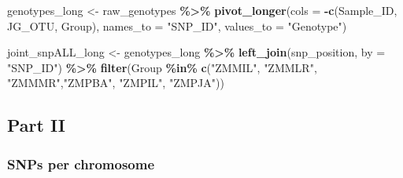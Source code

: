 \documentclass[
]{article}
\newenvironment{Shaded}{\begin{snugshade}}{\end{snugshade}}
\newcommand{\AttributeTok}[1]{\textcolor[rgb]{0.13,0.29,0.53}{#1}}
\newcommand{\FunctionTok}[1]{\textcolor[rgb]{0.13,0.29,0.53}{\textbf{#1}}}
\newcommand{\NormalTok}[1]{#1}
\newcommand{\OtherTok}[1]{\textcolor[rgb]{0.56,0.35,0.01}{#1}}
\newcommand{\SpecialCharTok}[1]{\textcolor[rgb]{0.81,0.36,0.00}{\textbf{#1}}}
\newcommand{\StringTok}[1]{\textcolor[rgb]{0.31,0.60,0.02}{#1}}
\begin{document}
\begin{Shaded}
\begin{Highlighting}[]
\NormalTok{genotypes\_long }\OtherTok{\textless{}{-}}\NormalTok{ raw\_genotypes }\SpecialCharTok{\%\textgreater{}\%}
  \FunctionTok{pivot\_longer}\NormalTok{(}\AttributeTok{cols =} \SpecialCharTok{{-}}\FunctionTok{c}\NormalTok{(Sample\_ID, JG\_OTU, Group), }\AttributeTok{names\_to =} \StringTok{"SNP\_ID"}\NormalTok{, }\AttributeTok{values\_to =} \StringTok{"Genotype"}\NormalTok{)}

\NormalTok{joint\_snpALL\_long }\OtherTok{\textless{}{-}}\NormalTok{ genotypes\_long }\SpecialCharTok{\%\textgreater{}\%}
  \FunctionTok{left\_join}\NormalTok{(snp\_position, }\AttributeTok{by =} \StringTok{"SNP\_ID"}\NormalTok{) }\SpecialCharTok{\%\textgreater{}\%} 
  \FunctionTok{filter}\NormalTok{(Group }\SpecialCharTok{\%in\%} \FunctionTok{c}\NormalTok{(}\StringTok{"ZMMIL"}\NormalTok{, }\StringTok{"ZMMLR"}\NormalTok{, }\StringTok{"ZMMMR"}\NormalTok{,}\StringTok{"ZMPBA"}\NormalTok{, }\StringTok{"ZMPIL"}\NormalTok{, }\StringTok{"ZMPJA"}\NormalTok{))}
\end{Highlighting}
\end{Shaded}

\subsection{Part II}\label{part-ii}

\subsubsection{SNPs per chromosome}\label{snps-per-chromosome}
\end{document}
